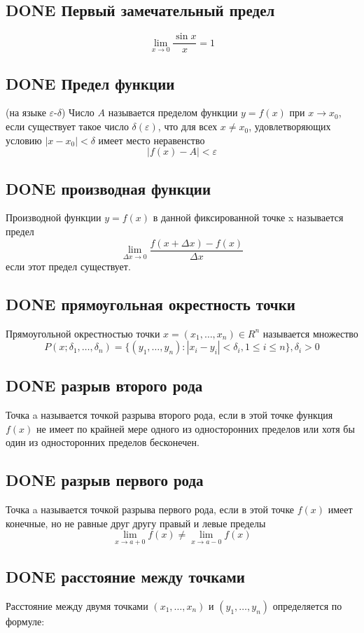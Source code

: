 \documentclass[11pt]{article}
\begin{document}
\subsection{{\bfseries\sffamily DONE} Первый замечательный предел}
\label{sec:org3a3b963}
$$\lim\limits_{x\to 0}\frac{\sin x}{x}=1$$
\subsection{{\bfseries\sffamily DONE} Предел функции}
\label{sec:orgdd89021}
(на языке \(\varepsilon\)-\(\delta\)) Число \(A\) называется пределом функции \(y=f(x)\) при \(x\to x_0\), если существует такое число \(\delta(\varepsilon)\), что для всех \(x\ne x_0\), удовлетворяющих условию \(|x−x_0|<\delta\) имеет место неравенство
$$|f(x)−A|<\varepsilon$$
\subsection{{\bfseries\sffamily DONE} производная функции}
\label{sec:org2b47706}
Производной функции \(y=f(x)\) в данной фиксированной точке x называется предел
$$\lim\limits_{\Delta x→0}\frac{f(x+\Delta x)−f(x)}{\Delta x}$$
если этот предел существует.
\subsection{{\bfseries\sffamily DONE} прямоугольная окрестность точки}
\label{sec:orgcdbd155}
Прямоугольной окрестностью точки \(x=(x_1,…,x_n)\in R^n\) называется множество 
$$P(x;δ_1,…,δ_n)=\{(y_1,…,y_n):|x_i−y_i|<δ_i ,1\leq i\leq n\}, δ_i>0$$
\subsection{{\bfseries\sffamily DONE} разрыв второго рода}
\label{sec:org66faca8}
Точка a называется точкой разрыва второго рода, если в этой точке функция \(f(x)\) не имеет по крайней мере одного из односторонних пределов или хотя бы один из односторонних пределов бесконечен.
\subsection{{\bfseries\sffamily DONE} разрыв первого рода}
\label{sec:org6ab07d6}
Точка a называется точкой разрыва первого рода, если в этой точке \(f(x)\) имеет конечные, но не равные друг другу правый и левые пределы
$$\lim\limits_{x\to a+0}f(x)\ne\lim\limits_{x\to a−0}f(x)$$
\subsection{{\bfseries\sffamily DONE} расстояние между точками}
\label{sec:orgfec479d}
Расстояние между двумя точками \((x_1,…,x_n)\) и \((y_1,…,y_n)\) определяется по формуле:
\end{document}
